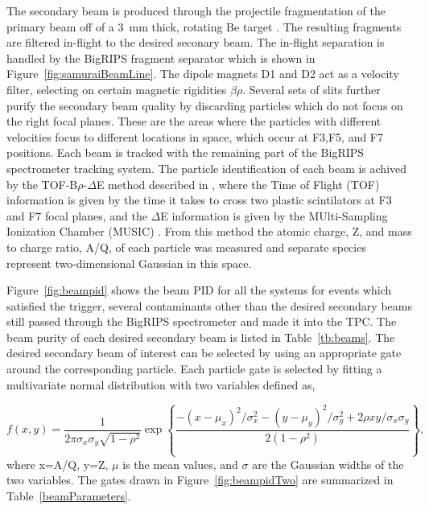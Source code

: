 The secondary beam is produced through the projectile fragmentation of the primary beam off of a \SI{3}{\milli\metre} thick, rotating Be target \cite{inflightsep}. The resulting fragments are filtered in-flight to the desired seconary beam. The in-flight separation is handled by the BigRIPS fragment separator which is shown in Figure~\ref{fig:samuraiBeamLine}. The dipole magnets D1 and D2 act as a velocity filter, selecting on certain magnetic rigidities $\beta\rho$. Several sets of slits further purify the secondary beam quality by discarding particles which do not focus on the right focal planes. These are the areas where the particles with different velocities focus to different locations in space, which occur at F3,F5, and F7 positions.  Each beam is tracked with the remaining part of the BigRIPS spectrometer tracking system. The particle identification of each beam is achived by the TOF-B$\rho$-$\Delta$E method described in \cite{bigrips}, where the Time of Flight (TOF) information is given by the time it takes to cross two plastic scintilators at F3 and F7 focal planes, and the $\Delta$E information is given by the MUlti-Sampling Ionization Chamber (MUSIC) \cite{music}. From this method the atomic charge, Z, and mass to charge ratio, A/Q, of each particle was measured and separate species represent two-dimensional Gaussian in this space. 

Figure~\ref{fig:beampid} shows the beam PID for all the systems for events which satisfied the trigger, several contaminants other than the desired secondary beams still passed through the BigRIPS spectrometer and made it into the TPC. The beam purity of each desired secondary beam is listed in Table~\ref{tb:beams}. The desired secondary beam of interest can be selected by using an appropriate gate around the corresponding particle. Each particle gate is selected by fitting a multivariate normal distribution with two variables defined as,

\begin{equation}
  f(x,y)=\frac1{2\pi\sigma_x\sigma_y\sqrt{1-\rho^2}}\exp\left\{
  \frac{-(x - \mu_{x})^2/\sigma_x^2-(y-\mu_{y})^2/\sigma_y^2+2\rho
  xy/\sigma_x\sigma_y}{2(1-\rho^2)}\right\},
   \label{multiGauss}
\end{equation}
where x=A/Q, y=Z, $\mu$ is the mean values, and $\sigma$ are the Gaussian widths of the two variables. The gates drawn in Figure~\ref{fig:beampidTwo} are summarized in Table~\ref{beamParameters}. 

